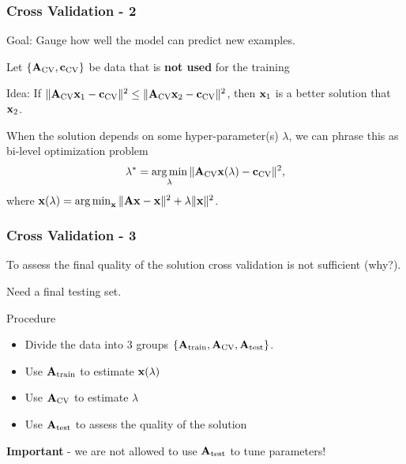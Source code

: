 \documentclass[12pt,fleqn]{beamer}
\begin{document}
\begin{frame}
	\frametitle{Cross Validation - 2}

Goal: Gauge how well the model can predict new examples.

\bigskip

Let $\{ {\bf A}_{\rm CV}, {\bf c}_{\rm CV} \}$ be data that is {\bf not used} for the training 

\bigskip

Idea: If $\|{\bf A}_{\rm CV} {\bf x}_1 - {\bf c}_{\rm CV}\|^2 \le 
\|{\bf A}_{\rm CV} {\bf x}_2 - {\bf c}_{\rm CV}\|^2$,
then ${\bf x}_1$ is a better solution that ${\bf x}_2$.

\bigskip

\pause

When the solution depends on some hyper-parameter(s) $\lambda$, we can phrase this as bi-level optimization problem
\begin{equation*}
 \lambda^* = \operatorname*{arg\,min}_{\lambda} \|{\bf A}_{\rm CV} {\bf x}(\lambda) - {\bf c}_{\rm CV}\|^2,
\end{equation*}
where  ${\bf x}(\lambda) = \operatorname*{arg\,min}_{\bf x} \|{\bf A} {\bf x} - {\bf x} \|^2 + \lambda \|{\bf x}\|^2$.

\end{frame}

\begin{frame}
	\frametitle{Cross Validation - 3}

To assess the final quality of the solution cross validation is not sufficient (why?).

\bigskip

Need a final testing set.

\bigskip

Procedure
\begin{itemize}
\item Divide the data into 3 groups $\{ {\bf A}_{\rm train}, {\bf A}_{\rm CV}, {\bf A}_{\rm test} \}$.
\item Use ${\bf A}_{\rm train}$ to estimate ${\bf x}(\lambda)$
\item Use ${\bf A}_{\rm CV}$ to estimate $\lambda$
\item Use ${\bf A}_{\rm test}$ to assess the quality of the solution
\end{itemize}

\pause

{\bf Important} -  we are not allowed to use ${\bf A}_{\rm test}$ to tune parameters!

\end{frame}
\end{document}
